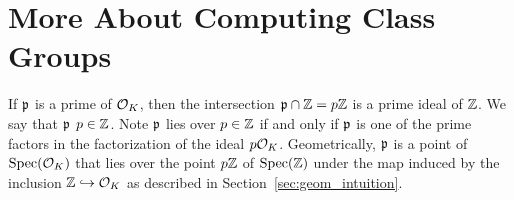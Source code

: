 


\section{More About Computing Class Groups}\label{sec:comcg}
If $\mathfrak{p}$ is a prime of $\mathcal{O}_K$, then the intersection $\mathfrak{p}\cap \mathbb{Z}=p\mathbb{Z}$ is
a prime ideal of $\mathbb{Z}$.  We say that $\mathfrak{p}$  $p\in\mathbb{Z}$.
Note $\mathfrak{p}$ lies over $p\in\mathbb{Z}$ if and only if $\mathfrak{p}$ is one of the prime
factors in the factorization of the ideal $p\mathcal{O}_K$.  Geometrically,
$\mathfrak{p}$ is a point of $\operatorname{Spec}(\mathcal{O}_K)$ that lies over the point $p\mathbb{Z}$ of
$\operatorname{Spec}(\mathbb{Z})$ under the map induced by the inclusion $\mathbb{Z}\hookrightarrow \mathcal{O}_K$
as described in Section~\ref{sec:geom_intuition}.


